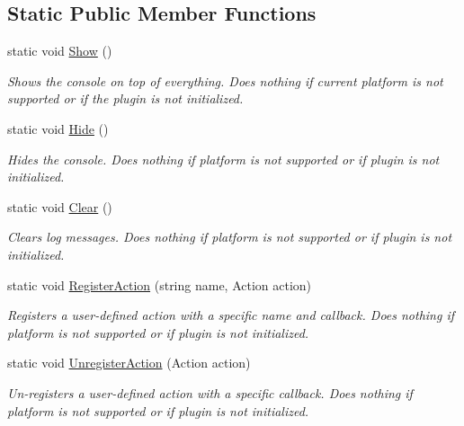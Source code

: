 \subsection*{Static Public Member Functions}
\begin{DoxyCompactItemize}
\item 
static void \mbox{\hyperlink{class_lunar_console_plugin_1_1_lunar_console_a2739ddde546c2989facf03fb0985009d}{Show}} ()
\begin{DoxyCompactList}\small\item\em Shows the console on top of everything. Does nothing if current platform is not supported or if the plugin is not initialized. \end{DoxyCompactList}\item 
static void \mbox{\hyperlink{class_lunar_console_plugin_1_1_lunar_console_a90d09a226f1abc6ea1d1bd3c3f884127}{Hide}} ()
\begin{DoxyCompactList}\small\item\em Hides the console. Does nothing if platform is not supported or if plugin is not initialized. \end{DoxyCompactList}\item 
static void \mbox{\hyperlink{class_lunar_console_plugin_1_1_lunar_console_a886f0926aaa4792a3313e2b7bf08e0e4}{Clear}} ()
\begin{DoxyCompactList}\small\item\em Clears log messages. Does nothing if platform is not supported or if plugin is not initialized. \end{DoxyCompactList}\item 
static void \mbox{\hyperlink{class_lunar_console_plugin_1_1_lunar_console_acef4779357950452589fe76b8a8b4048}{Register\+Action}} (string name, Action action)
\begin{DoxyCompactList}\small\item\em Registers a user-\/defined action with a specific name and callback. Does nothing if platform is not supported or if plugin is not initialized. \end{DoxyCompactList}\item 
static void \mbox{\hyperlink{class_lunar_console_plugin_1_1_lunar_console_a4466fffbb7a8099d99e835e5fb36b029}{Unregister\+Action}} (Action action)
\begin{DoxyCompactList}\small\item\em Un-\/registers a user-\/defined action with a specific callback. Does nothing if platform is not supported or if plugin is not initialized. \end{DoxyCompactList}\item 

\end{DoxyCompactItemize}
